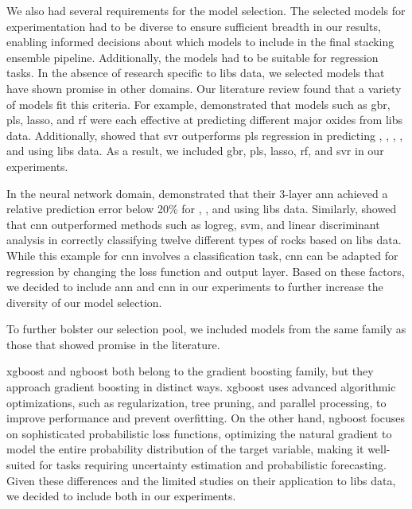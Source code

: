 We also had several requirements for the model selection.
The selected models for experimentation had to be diverse to ensure sufficient breadth in our results, enabling informed decisions about which models to include in the final stacking ensemble pipeline.
Additionally, the models had to be suitable for regression tasks.
In the absence of research specific to \gls{libs} data, we selected models that have shown promise in other domains.
Our literature review found that a variety of models fit this criteria.
For example, \citet{andersonPostlandingMajorElement2022} demonstrated that models such as \gls{gbr}, \gls{pls}, \gls{lasso}, and \gls{rf} were each effective at predicting different major oxides from \gls{libs} data.
Additionally, \citet{svrforlibs} showed that \gls{svr} outperforms \gls{pls} regression in predicting , , , , and  using \gls{libs} data.
As a result, we included \gls{gbr}, \gls{pls}, \gls{lasso}, \gls{rf}, and \gls{svr} in our experiments.

In the neural network domain, \citet{ann_libs_soil_analysis} demonstrated that their 3-layer \gls{ann} achieved a relative prediction error below 20\% for , , and  using \gls{libs} data.
Similarly, \citet{yangConvolutionalNeuralNetwork2022} showed that \gls{cnn} outperformed methods such as \gls{logreg}, \gls{svm}, and linear discriminant analysis in correctly classifying twelve different types of rocks based on \gls{libs} data.
While this example for \gls{cnn} involves a classification task, \gls{cnn} can be adapted for regression by changing the loss function and output layer.
Based on these factors, we decided to include \gls{ann} and \gls{cnn} in our experiments to further increase the diversity of our model selection.

To further bolster our selection pool, we included models from the same family as those that showed promise in the literature.

\gls{xgboost} and \gls{ngboost} both belong to the gradient boosting family, but they approach gradient boosting in distinct ways.
\gls{xgboost} uses advanced algorithmic optimizations, such as regularization, tree pruning, and parallel processing, to improve performance and prevent overfitting.
On the other hand, \gls{ngboost} focuses on sophisticated probabilistic loss functions, optimizing the natural gradient to model the entire probability distribution of the target variable, making it well-suited for tasks requiring uncertainty estimation and probabilistic forecasting.
Given these differences and the limited studies on their application to \gls{libs} data, we decided to include both in our experiments.

